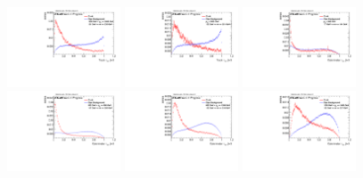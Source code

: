 \begin{figure}
\includegraphics[width=0.3\textwidth]{sascha_input/Appendix/Distributions/top/distributions/beta3/h_normal_tj_nSub32_3_bin5.pdf} \hspace{1mm}
\includegraphics[width=0.3\textwidth]{sascha_input/Appendix/Distributions/top/distributions/beta3/h_normal_tj_nSub32_3_bin6.pdf} 
\bigskip
\includegraphics[width=0.3\textwidth]{sascha_input/Appendix/Distributions/top/distributions/beta3/h_recoJet_nSub32_3_bin1.pdf} \hspace{1mm}
\includegraphics[width=0.3\textwidth]{sascha_input/Appendix/Distributions/top/distributions/beta3/h_recoJet_nSub32_3_bin2.pdf} \hspace{1mm}
\includegraphics[width=0.3\textwidth]{sascha_input/Appendix/Distributions/top/distributions/beta3/h_recoJet_nSub32_3_bin3.pdf} 
\bigskip
\includegraphics[width=0.3\textwidth]{sascha_input/Appendix/Distributions/top/distributions/beta3/h_recoJet_nSub32_3_bin4.pdf} \hspace{6mm}

\end{figure}

